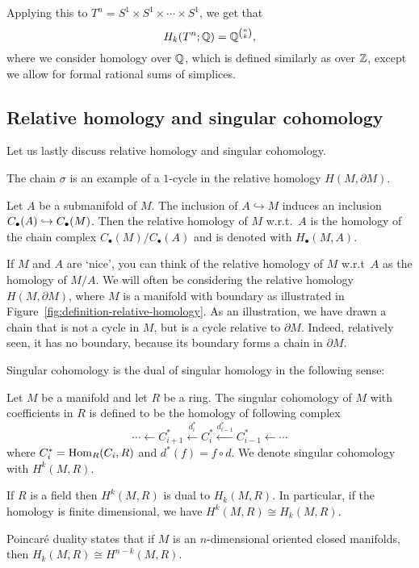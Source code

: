 \begin{eg}
    Applying this to $T^{n} = S^1 \times S^{1} \times \cdots\times S^{1}$, we get that
    \[
        H_k(T^n; \mathbb{Q}) = \mathbb{Q}^{\binom{n}{k}}
    ,\] 
    where we consider homology over $\mathbb{Q}$, which is defined similarly as over $\mathbb{Z}$, except we allow for formal rational sums of simplices.
\end{eg}

\subsection*{Relative homology and singular cohomology}

Let us lastly discuss relative homology and singular cohomology.


\begin{marginfigure}
    \centering
    \caption{The chain $\sigma$ is an example of a  $1$-cycle in the relative homology $H(M, \partial M)$.}
    \label{fig:definition-relative-homology}
\end{marginfigure}
\begin{definition}
    Let $A$ be a submanifold of $M$.
    The inclusion of $A \hookrightarrow M$ induces an inclusion  $C_{\bullet}(A) \hookrightarrow C_{\bullet}(M)$.
    Then the relative homology of $M$ w.r.t.\  $A$ is the homology of the chain complex  $C_\bullet(M) / C_\bullet(A)$ and is denoted with $H_{\bullet}(M, A)$.
\end{definition}

If $M$ and $A$ are `nice', you can think of the relative homology of $M$ w.r.t\  $A$ as the homology of  $M / A$.
We will often be considering the relative homology $H(M, \partial M)$, where $M$ is a manifold with boundary as illustrated in Figure~\ref{fig:definition-relative-homology}.
As an illustration, we have drawn a chain that is not a cycle in $M$, but is a cycle relative to $\partial M$. Indeed, relatively seen, it has no boundary, because its boundary forms a chain in $\partial M$.

\bigskip

Singular cohomology is the dual of singular homology in the following sense:
\begin{definition}
    Let $M$ be a manifold and let $R$ be a ring.
    The singular cohomology of $M$ with coefficients in $R$ is defined to be the homology of following complex
    \[
    \cdots \leftarrow C_{i+1}^{*} \xleftarrow{d_i^{*}}  
    C_{i}^{*} \xleftarrow{d_{i-1}^{*}}  
    C_{i-1}^{*} \leftarrow \cdots
    \] 
    where $C_{i}^{*} = \operatorname{Hom}_R(C_i, R)$ and $d^{*}(f) = f \circ  d$.
    We denote singular cohomology with $H^{k}(M, R)$.
\end{definition}
\begin{remark}
    If $R$ is a field then $H^{k}(M, R)$ is dual to $H_k(M, R)$.
    In particular, if the homology is finite dimensional, we have $H^{k}(M, R) \cong H_k(M, R)$.
\end{remark}
\begin{remark}
    Poincaré duality states that if $M$ is an  $n$-dimensional oriented closed manifolds, then $H_k(M, R) \cong H^{n-k}(M, R)$.
\end{remark}

